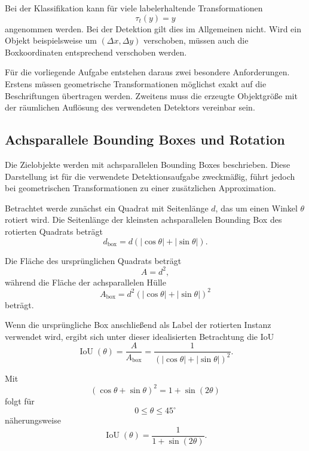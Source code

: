 Bei der Klassifikation kann für viele labelerhaltende Transformationen
\begin{equation}
\tau_t(y)=y
\end{equation}
angenommen werden. Bei der Detektion gilt dies im Allgemeinen nicht. Wird ein Objekt beispielsweise um $(\Delta x,\Delta y)$ verschoben, müssen auch die Boxkoordinaten entsprechend verschoben werden.

Für die vorliegende Aufgabe entstehen daraus zwei besondere Anforderungen. Erstens müssen geometrische Transformationen möglichst exakt auf die Beschriftungen übertragen werden. Zweitens muss die erzeugte Objektgröße mit der räumlichen Auflösung des verwendeten Detektors vereinbar sein.

\subsection{Achsparallele Bounding Boxes und Rotation}

Die Zielobjekte werden mit achsparallelen Bounding Boxes beschrieben. Diese Darstellung ist für die verwendete Detektionsaufgabe zweckmäßig, führt jedoch bei geometrischen Transformationen zu einer zusätzlichen Approximation.

Betrachtet werde zunächst ein Quadrat mit Seitenlänge $d$, das um einen Winkel $\theta$ rotiert wird. Die Seitenlänge der kleinsten achsparallelen Bounding Box des rotierten Quadrats beträgt
\begin{equation}
d_{\mathrm{box}}
=
d\left(
|\cos\theta|+|\sin\theta|
\right).
\tag{3.5}
\end{equation}

Die Fläche des ursprünglichen Quadrats beträgt
\begin{equation}
A=d^2,
\end{equation}
während die Fläche der achsparallelen Hülle
\begin{equation}
A_{\mathrm{box}}
=
d^2
\left(
|\cos\theta|+|\sin\theta|
\right)^2
\end{equation}
beträgt.

Wenn die ursprüngliche Box anschließend als Label der rotierten Instanz verwendet wird, ergibt sich unter dieser idealisierten Betrachtung die IoU
\begin{equation}
\operatorname{IoU}(\theta)
=
\frac{A}{A_{\mathrm{box}}}
=
\frac{1}{
\left(
|\cos\theta|+|\sin\theta|
\right)^2
}.
\tag{3.6}
\end{equation}

Mit
\begin{equation}
(\cos\theta+\sin\theta)^2
=
1+\sin(2\theta)
\end{equation}
folgt für
\begin{equation}
0\leq\theta\leq45^\circ
\end{equation}
näherungsweise
\begin{equation}
\operatorname{IoU}(\theta)
=
\frac{1}{1+\sin(2\theta)}.
\tag{3.7}
\end{equation}

